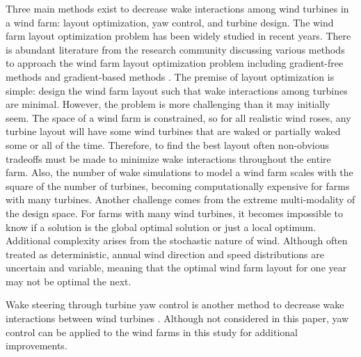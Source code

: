 \documentclass[WESD, manuscript]{copernicus}
\begin{document}
Three main methods exist to decrease wake interactions among wind turbines in a wind farm: layout optimization, yaw control, and turbine design. The wind farm layout optimization problem has been widely studied in recent years. There is abundant literature from the research community discussing various methods to approach the wind farm layout optimization problem including gradient-free methods \citep{marmidis2008optimal,emami2010new,kusiak2010design,ituarte2011optimization,feng2015solving,gao2015wind} and gradient-based methods \citep{perez2013offshore,park2015layout,Fleming2016,guirguis2016toward,gebraad2017maximization}. The premise of layout optimization is simple: design the wind farm layout such that wake interactions among turbines are minimal.
However, the problem is more challenging than it may initially seem. 
The space of a wind farm is constrained, so for all realistic wind roses, any turbine layout will have some wind turbines that are waked or partially waked some or all of the time. Therefore, to find the best layout often non-obvious tradeoffs must be made to minimize wake interactions throughout the entire farm.
Also, the number of wake simulations to model a wind farm scales with the square of the number of turbines, becoming computationally expensive for farms with many turbines. Another challenge comes from the extreme multi-modality of the design space. For farms with many wind turbines, it becomes impossible to know if a solution is the global optimal solution or just a local optimum.  Additional complexity arises from the stochastic nature of wind. Although often treated as deterministic, annual wind direction and speed distributions are uncertain and variable, meaning that the optimal wind farm layout for one year may not be optimal the next.



Wake steering through turbine yaw control is another method to decrease wake interactions between wind turbines  \citep{Fleming2016,gebraad2017maximization}. Although not considered in this paper, yaw control can be applied to the wind farms in this study for additional improvements.
\end{document}
